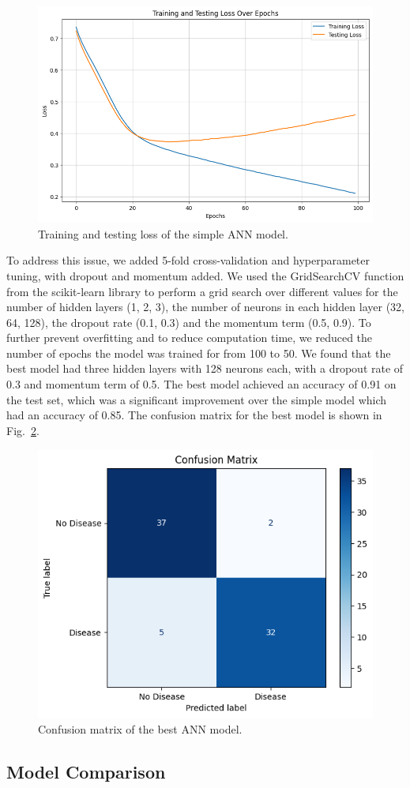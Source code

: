 \begin{figure}[htbp]
    \centerline{\includegraphics[scale=0.435]{img/annoverfitting.png}}
    \caption{Training and testing loss of the simple ANN model.}\label{annoverfitting}
\end{figure}

To address this issue, we added 5-fold cross-validation and hyperparameter tuning, with dropout and momentum added. We used the GridSearchCV function from the scikit-learn library to perform a grid search over different values for the number of hidden layers (1, 2, 3), the number of neurons in each hidden layer (32, 64, 128), the dropout rate (0.1, 0.3) and the momentum term (0.5, 0.9). To further prevent overfitting and to reduce computation time, we reduced the number of epochs the model was trained for from 100 to 50. We found that the best model had three hidden layers with 128 neurons each, with a dropout rate of 0.3 and momentum term of 0.5. The best model achieved an accuracy of 0.91 on the test set, which was a significant improvement over the simple model which had an accuracy of 0.85. The confusion matrix for the best model is shown in Fig.~\ref{annconfusion}.

\begin{figure}[htbp]
    \centerline{\includegraphics[scale=.65]{img/annconfusion.png}}
    \caption{Confusion matrix of the best ANN model.}\label{annconfusion}
\end{figure}

\subsection{Model Comparison}